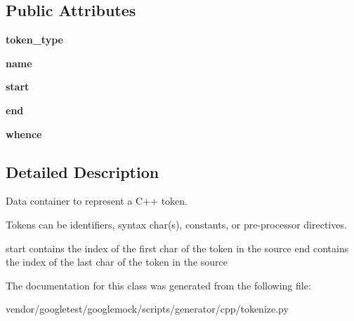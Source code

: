 \subsection*{Public Attributes}
\begin{DoxyCompactItemize}
\item 
\mbox{\label{classcpp_1_1tokenize_1_1_token_a60c6e5120f3947885f10788ceb69a660}} 
{\bfseries token\+\_\+type}
\item 
\mbox{\label{classcpp_1_1tokenize_1_1_token_a90859dd16bde71bc38f717f5119e63b9}} 
{\bfseries name}
\item 
\mbox{\label{classcpp_1_1tokenize_1_1_token_a8ec48e348ff29901857cb21553da464b}} 
{\bfseries start}
\item 
\mbox{\label{classcpp_1_1tokenize_1_1_token_a9935738c382352eca19834c2533715db}} 
{\bfseries end}
\item 
\mbox{\label{classcpp_1_1tokenize_1_1_token_a9d3a8011707ede6be85987d74f88848d}} 
{\bfseries whence}
\end{DoxyCompactItemize}


\subsection{Detailed Description}
\begin{DoxyVerb}Data container to represent a C++ token.

Tokens can be identifiers, syntax char(s), constants, or
pre-processor directives.

start contains the index of the first char of the token in the source
end contains the index of the last char of the token in the source
\end{DoxyVerb}
 

The documentation for this class was generated from the following file\+:\begin{DoxyCompactItemize}
\item 
vendor/googletest/googlemock/scripts/generator/cpp/tokenize.\+py\end{DoxyCompactItemize}
